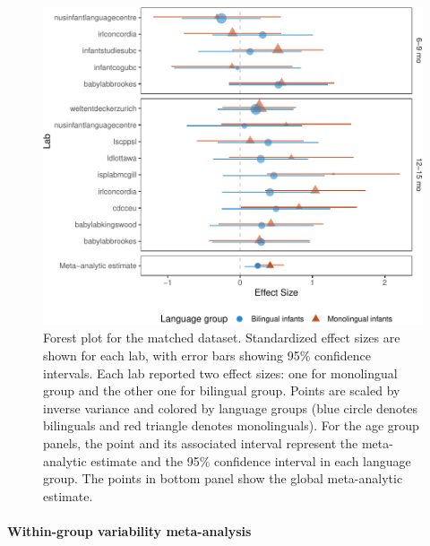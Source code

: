\documentclass[english,,man,floatsintext]{apa6}
\begin{document}
\begin{figure}
\centering
\includegraphics{mb1b-paper_files/figure-latex/unnamed-chunk-3-1.pdf}
\caption{\label{fig:unnamed-chunk-3}Forest plot for the matched dataset. Standardized effect sizes are shown for each lab, with error bars showing 95\% confidence intervals. Each lab reported two effect sizes: one for monolingual group and the other one for bilingual group. Points are scaled by inverse variance and colored by language groups (blue circle denotes bilinguals and red triangle denotes monolinguals). For the age group panels, the point and its associated interval represent the meta-analytic estimate and the 95\% confidence interval in each language group. The points in bottom panel show the global meta-analytic estimate.}
\end{figure}

\hypertarget{within-group-variability-meta-analysis}{%
\paragraph{Within-group variability meta-analysis}\label{within-group-variability-meta-analysis}}
\end{document}

